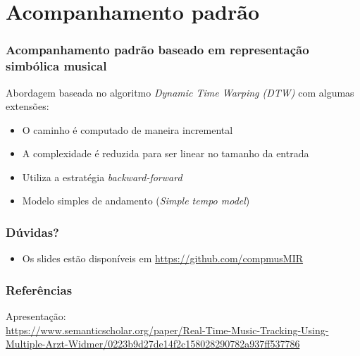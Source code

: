 \documentclass[serif,mathserif]{beamer}
\begin{document}
\section{Acompanhamento padrão}
\begin{frame}
  \frametitle{Acompanhamento padrão baseado em representação simbólica musical}
  Abordagem baseada no algoritmo \emph{Dynamic Time Warping (DTW)} com algumas extensões:\pause %
  \begin{itemize}
    \item O caminho é computado de maneira incremental\\\pause
    \item A complexidade é reduzida para ser linear no tamanho da entrada\pause
    \item Utiliza a estratégia \emph{backward-forward} %
    \item Modelo simples de andamento (\emph{Simple tempo model}) %
  \end{itemize}
\end{frame}



\begin{frame}
  \frametitle{Dúvidas?}
  \begin{itemize}
    \item Os slides estão disponíveis em \url{https://github.com/compmusMIR}
  \end{itemize}
\end{frame}

\begin{frame}
  \frametitle{Referências}
  \small
  Apresentação:\\
  \vspace{2mm}
  \url{https://www.semanticscholar.org/paper/Real-Time-Music-Tracking-Using-Multiple-Arzt-Widmer/0223b9d27de14f2c158028290782a937ff537786}


\end{frame}
\end{document}
